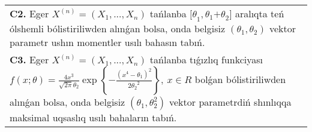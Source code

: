 \documentclass{article}
\begin{document}
\begin{tabular}{m{17cm}}
 \\
\textbf{C2.} 
Eger \(X^{(n)} = \left( X_{1},...,X_{n} \right)\) tańlanba \({\lbrack\theta}_{1},\theta_{1}{+ \theta}_{2}\rbrack\) aralıqta teń ólshemli bólistiriliwden alınǵan bolsa, onda belgisiz \(\left( \theta_{1},\theta_{2} \right)\) vektor parametr ushın momentler usılı bahasın tabıń.
 \\
\textbf{C3.} 
Eger \(X^{(n)} = \left( X_{1},...,X_{n} \right)\) tańlanba tıǵızlıq funkciyası
$f(x;\theta) = \frac{4x^{3}}{\sqrt{2\pi}\theta_{2}}\exp\left\{ - \frac{\left( x^{4} - \theta_{1} \right)^{2}}{2{\theta_{2}}^{2}} \right\},\ x \in R$
bolǵan bólistiriliwden alınǵan bolsa, onda belgisiz \(\left( \theta_{1},\theta_{2}^{2} \right)\) vektor parametrdiń shınlıqqa maksimal uqsaslıq usılı bahaların tabıń.
 \\

\end{tabular}
\vspace{1cm}
\end{document}
